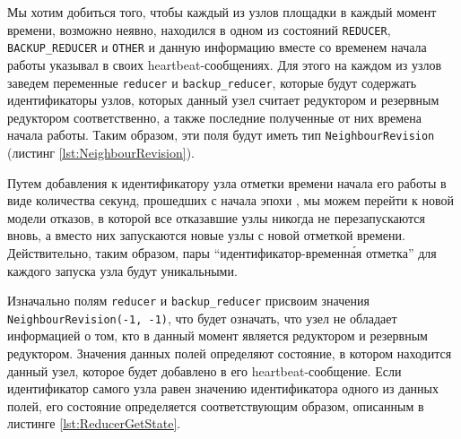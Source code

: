 \documentclass{article}
\theoremstyle{plain}
\theoremstyle{plain}
\theoremstyle{plain}
\theoremstyle{plain}
\theoremstyle{definition}
\theoremstyle{remark}
\theoremstyle{plain}
\begin{document}
Мы хотим добиться того, чтобы каждый из узлов площадки в каждый момент времени, возможно неявно, находился в одном из состояний \texttt{REDUCER}, \texttt{BACKUP\_REDUCER} и \texttt{OTHER} и данную информацию вместе со временем начала работы указывал в своих heartbeat-со\-об\-ще\-ниях. Для этого на каждом из узлов заведем переменные \texttt{reducer} и \texttt{backup\_reducer}, которые будут содержать идентификаторы узлов, которых данный узел считает редуктором и резервным редуктором соответственно, а также последние полученные от них времена начала работы. Таким образом, эти поля будут иметь тип \texttt{NeighbourRevision} (листинг \ref{lst:NeighbourRevision}).


Путем добавления к идентификатору узла отметки времени начала его работы в виде количества секунд, прошедших с начала эпохи \cite{UNIX_timestamp}, мы можем перейти к новой модели отказов, в которой все отказавшие узлы никогда не перезапускаются вновь, а вместо них запускаются новые узлы с новой отметкой времени. Действительно, таким образом, пары \enquote{идентификатор-временн\'{а}я отметка} для каждого запуска узла будут уникальными.

Изначально полям \texttt{reducer} и \texttt{backup\_reducer} присвоим значения \texttt{Neigh\-bour\-Re\-vi\-si\-on(-1, -1)}, что будет означать, что узел не обладает информацией о том, кто в данный момент является редуктором и резервным редуктором. Значения данных полей определяют состояние, в котором находится данный узел, которое будет добавлено в его heartbeat-со\-об\-ще\-ние. Если идентификатор самого узла равен значению идентификатора одного из данных полей, его состояние определяется соответствующим образом, описанным в листинге \ref{lst:ReducerGetState}.

\end{document}
